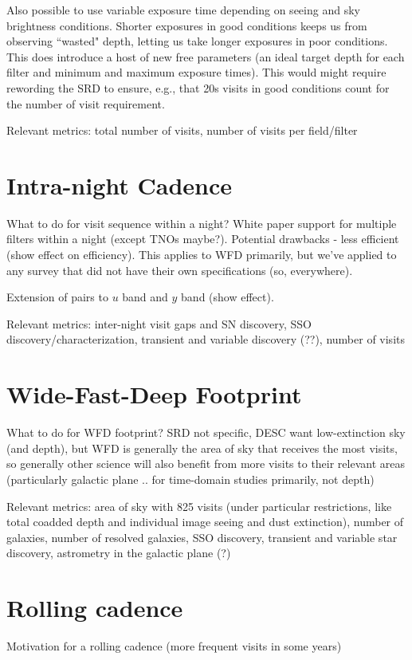 Also possible to use variable exposure time depending on seeing and sky brightness conditions. Shorter exposures in good conditions keeps us from observing ``wasted" depth, letting us take longer exposures in poor conditions. This does introduce a host of new free parameters (an ideal target depth for each filter and minimum and maximum exposure times).  This would might require rewording the SRD to ensure, e.g., that 20s visits in good conditions count for the number of visit requirement.

Relevant metrics: total number of visits, number of visits per field/filter

\section{Intra-night Cadence}
What to do for visit sequence within a night? White paper support for multiple filters within a night (except TNOs maybe?). Potential drawbacks - less efficient (show effect on efficiency). This applies to WFD primarily, but we've applied to any survey that did not have their own specifications (so, everywhere). 

Extension of pairs to $u$ band and $y$ band (show effect). 

Relevant metrics: inter-night visit gaps and SN discovery, SSO discovery/characterization, transient and variable discovery (??), number of visits

\section{Wide-Fast-Deep Footprint}
What to do for WFD footprint? SRD not specific, DESC want low-extinction sky (and depth), but WFD is generally the area of sky that receives the most visits, so generally other science will also benefit from more visits to their relevant areas (particularly galactic plane .. for time-domain studies primarily, not depth)

Relevant metrics: area of sky with 825 visits (under particular restrictions, like total coadded depth and individual image seeing and dust extinction), number of galaxies, number of resolved galaxies, SSO discovery, transient and variable star discovery, astrometry in the galactic plane (?)


\section{Rolling cadence}
Motivation for a rolling cadence (more frequent visits in some years)

